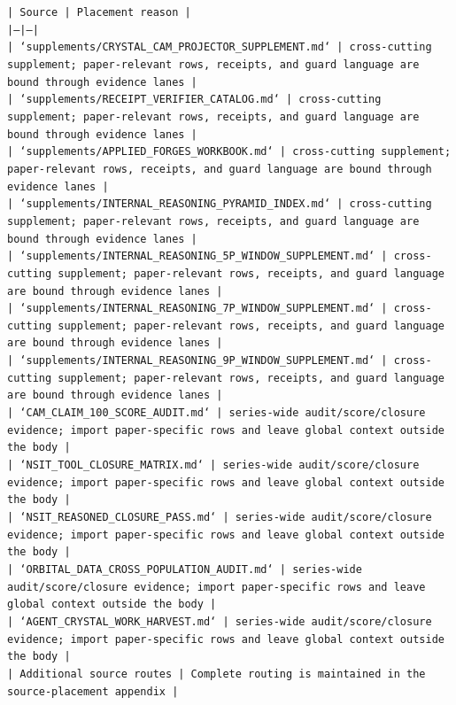 \documentclass[11pt]{article}
\begin{document}
\noindent\texttt{| Source | Placement reason |}\\
\noindent\texttt{|---|---|}\\
\noindent\texttt{| `supplements/CRYSTAL\_CAM\_PROJECTOR\_SUPPLEMENT.md` | cross-cutting supplement; paper-relevant rows, receipts, and guard language are bound through evidence lanes |}\\
\noindent\texttt{| `supplements/RECEIPT\_VERIFIER\_CATALOG.md` | cross-cutting supplement; paper-relevant rows, receipts, and guard language are bound through evidence lanes |}\\
\noindent\texttt{| `supplements/APPLIED\_FORGES\_WORKBOOK.md` | cross-cutting supplement; paper-relevant rows, receipts, and guard language are bound through evidence lanes |}\\
\noindent\texttt{| `supplements/INTERNAL\_REASONING\_PYRAMID\_INDEX.md` | cross-cutting supplement; paper-relevant rows, receipts, and guard language are bound through evidence lanes |}\\
\noindent\texttt{| `supplements/INTERNAL\_REASONING\_5P\_WINDOW\_SUPPLEMENT.md` | cross-cutting supplement; paper-relevant rows, receipts, and guard language are bound through evidence lanes |}\\
\noindent\texttt{| `supplements/INTERNAL\_REASONING\_7P\_WINDOW\_SUPPLEMENT.md` | cross-cutting supplement; paper-relevant rows, receipts, and guard language are bound through evidence lanes |}\\
\noindent\texttt{| `supplements/INTERNAL\_REASONING\_9P\_WINDOW\_SUPPLEMENT.md` | cross-cutting supplement; paper-relevant rows, receipts, and guard language are bound through evidence lanes |}\\
\noindent\texttt{| `CAM\_CLAIM\_100\_SCORE\_AUDIT.md` | series-wide audit/score/closure evidence; import paper-specific rows and leave global context outside the body |}\\
\noindent\texttt{| `NSIT\_TOOL\_CLOSURE\_MATRIX.md` | series-wide audit/score/closure evidence; import paper-specific rows and leave global context outside the body |}\\
\noindent\texttt{| `NSIT\_REASONED\_CLOSURE\_PASS.md` | series-wide audit/score/closure evidence; import paper-specific rows and leave global context outside the body |}\\
\noindent\texttt{| `ORBITAL\_DATA\_CROSS\_POPULATION\_AUDIT.md` | series-wide audit/score/closure evidence; import paper-specific rows and leave global context outside the body |}\\
\noindent\texttt{| `AGENT\_CRYSTAL\_WORK\_HARVEST.md` | series-wide audit/score/closure evidence; import paper-specific rows and leave global context outside the body |}\\
\noindent\texttt{| Additional source routes | Complete routing is maintained in the source-placement appendix |}\\
\end{document}

